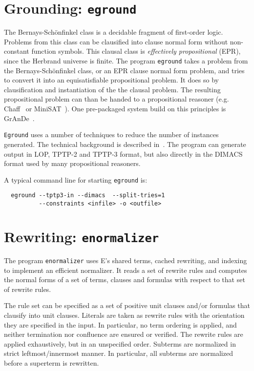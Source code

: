 \documentclass{report}
\begin{document}
\section{Grounding: \texttt{eground}}

The Bernays-Sch{\"o}nfinkel class is a decidable fragment of
first-order logic. Problems from this class can be clausified into
clause normal form without non-constant function symbols. This clausal
class is \emph{effectively propositional} (EPR), since the Herbrand
universe is finite. The program \texttt{eground} takes a problem from
the Bernays-Sch{\"o}nfinkel class, or an EPR clause normal form
problem, and tries to convert it into an equisatisfiable propositional
problem. It does so by clausification and instantiation of the the
clausal problem. The resulting propositional problem can than be
handed to a propositional reasoner (e.g. Chaff~\cite{MMZZM:DAC-2001}
or MiniSAT~\cite{ES:SAT-2004}). One pre-packaged system build on this
principles is GrAnDe~\cite{SS:CADE-2002}.

\texttt{Eground} uses a number of techniques to reduce the number of
instances generated. The technical background is described
in~\cite{Schulz:FLAIRS-2002}. The program can generate output in LOP,
TPTP-2 and TPTP-3 format, but also directly in the DIMACS format used
by many propositional reasoners.

A typical command line for starting \texttt{eground} is:

\begin{verbatim}
  eground --tptp3-in --dimacs  --split-tries=1
          --constraints <infile> -o <outfile>
\end{verbatim}


\section{Rewriting: \texttt{enormalizer}}

The program \texttt{enormalizer} uses E's shared terms, cached
rewriting, and indexing to implement an efficient normalizer. It reads
a set of rewrite rules and computes the normal forms of a set of
terms, clauses and formulas with respect to that set of rewrite rules.

The rule set can be specified as a set of positive unit clauses and/or
formulas that clausify into unit clauses. Literals are taken as
rewrite rules with the orientation they are specified in the input. In
particular, no term ordering is applied, and neither termination nor
confluence are ensured or verified. The rewrite rules are applied
exhaustively, but in an unspecified order. Subterms are normalized in
strict leftmost/innermost manner. In particular, all subterms are
normalized before a superterm is rewritten.
\end{document}
